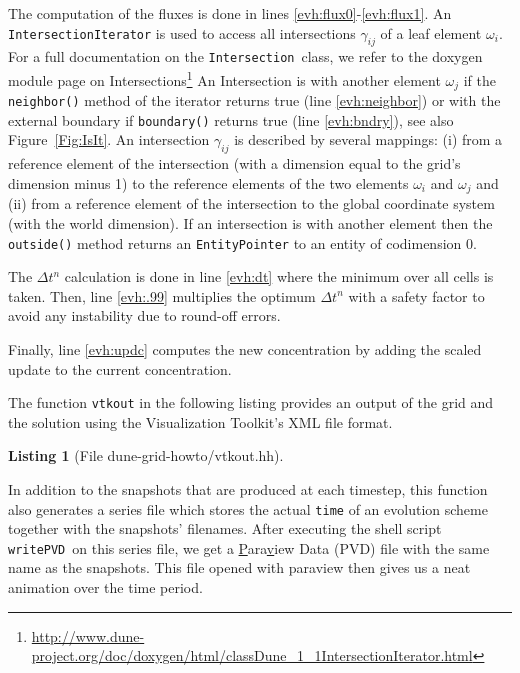 \documentclass[11pt,a4paper,headinclude,footinclude,DIV16,headings=normal]{scrreprt}
\newtheorem{lst}{Listing}
\begin{document}
The computation of the fluxes is done in lines
\ref{evh:flux0}-\ref{evh:flux1}. An \lstinline!IntersectionIterator!
is used to access all intersections $\gamma_{ij}$ of a leaf element
$\omega_i$. For a full documentation on the
\lstinline!Intersection!\ class, we refer to the doxygen module page on
Intersections\footnote{\url{http://www.dune-project.org/doc/doxygen/html/classDune_1_1IntersectionIterator.html}}
An Intersection is with another element $\omega_j$ if the
\lstinline!neighbor()! method of the iterator returns true (line
\ref{evh:neighbor}) or with the external boundary if
\lstinline!boundary()! returns true (line \ref{evh:bndry}), see also
Figure~\ref{Fig:IsIt}. An intersection $\gamma_{ij}$ is
described by several mappings: (i) from a reference element of the
intersection (with a dimension equal to the grid's dimension minus 1)
to the reference elements of the two elements $\omega_i$ and
$\omega_j$ and (ii) from a reference element of the intersection to
the global coordinate system (with the world dimension). If an
intersection is with another element then the \lstinline!outside()!
method returns an \lstinline!EntityPointer! to an entity of
codimension 0.

The $\Delta t^n$ calculation is done in line \ref{evh:dt} where the
minimum over all cells is taken. Then, line \ref{evh:.99} multiplies
the optimum $\Delta t^n$ with a safety factor to avoid any instability
due to round-off errors.

Finally, line \ref{evh:updc} computes the new concentration by adding
the scaled update to the current concentration.

The function \lstinline!vtkout! in the following listing provides an
output of the grid and the solution using the Visualization Toolkit's \cite{VTK}
XML file format.

\begin{lst}[File dune-grid-howto/vtkout.hh] \mbox{}
\nopagebreak

\end{lst}

In addition to the snapshots that are produced at each timestep, this function
also generates a series file which stores the actual \lstinline!time! of an
evolution scheme together with the snapshots' filenames.  After executing the
shell script \lstinline!writePVD!\ on this series file, we get a
\underline{P}ara\underline{v}iew {D}ata (PVD) file with the same name as the
snapshots. This file opened with paraview then gives us a neat animation over
the time period.
\end{document}
